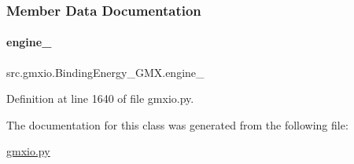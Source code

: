\subsubsection{Member Data Documentation}
\mbox{\label{classsrc_1_1gmxio_1_1BindingEnergy__GMX_a4c1f6291f6cc9cb0fa0e1d74d238d974}} 
\paragraph{\texorpdfstring{engine\+\_\+}{engine\_}}
{\footnotesize\ttfamily src.\+gmxio.\+Binding\+Energy\+\_\+\+G\+M\+X.\+engine\+\_\+}



Definition at line 1640 of file gmxio.\+py.



The documentation for this class was generated from the following file\+:\begin{DoxyCompactItemize}
\item 
\hyperlink{gmxio_8py}{gmxio.\+py}\end{DoxyCompactItemize}

